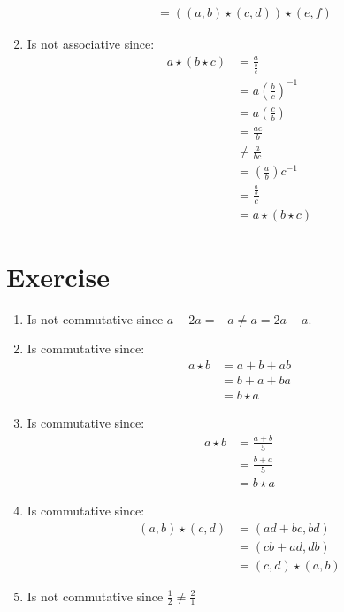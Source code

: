 \documentclass{article}
\begin{document}
\begin{enumerate}[label=(\alph*)]
\begin{align*}
        &= ((a, b) \star (c, d)) \star (e, f)
    \end{align*}
    \item Is not associative since:
    \begin{align*}
        a \star (b \star c) &= \frac{a}{\frac{b}{c}} \\
        &= a \left(\frac{b}{c}\right)^{-1} \\
        &= a \left(\frac{c}{b}\right) \\
        &= \frac{ac}{b} \\
        &\neq \frac{a}{bc} \\
        &= \left(\frac{a}{b}\right) c^{-1} \\
        &= \frac{\frac{a}{b}}{c} \\
        &= a \star (b \star c)
    \end{align*}
\end{enumerate}
\section{Exercise}
\begin{enumerate}[label=(\alph*)]
    \item Is not commutative since $a - 2a = -a \neq a = 2a - a$.
    \item Is commutative since:
    \begin{align*}
        a \star b &= a + b + ab \\
        &= b + a + ba \\
        &= b \star a
    \end{align*}
    \item Is commutative since:
    \begin{align*}
        a \star b &= \frac{a + b}{5} \\
        &= \frac{b + a}{5} \\
        &= b \star a
    \end{align*}
    \item Is commutative since:
    \begin{align*}
        (a, b) \star (c, d) &= (ad + bc, bd) \\
        &= (cb + ad, db) \\
        &= (c, d) \star (a, b) 
    \end{align*}
    \item Is not commutative since $\frac{1}{2} \neq \frac{2}{1}$
\end{enumerate}
\end{document}

